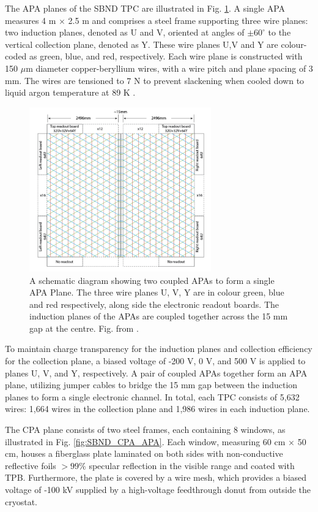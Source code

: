 The APA planes of the SBND TPC are illustrated in Fig. \ref{fig:SBND_APA}. 
A single APA measures 4 m $\times$ 2.5 m and comprises a steel frame supporting three wire planes: two induction planes, denoted as U and V, oriented at angles of $\pm 60^{\circ}$ to the vertical collection plane, denoted as Y. 
These wire planes U,V and Y are colour-coded as green, blue, and red, respectively.
Each wire plane is constructed with 150 $\mu$m diameter copper-beryllium wires, with a wire pitch and plane spacing of 3 mm. 
The wires are tensioned to 7 N to prevent slackening when cooled down to liquid argon temperature at 89 K \cite{SBND_Wires}.
\begin{figure}[hbp] 
\centering    
\includegraphics[width=0.70\textwidth]{SBND_APA}
\caption[SBND_APA]{
A schematic diagram showing two coupled APAs to form a single APA Plane.
The three wire planes U, V, Y are in colour green, blue and red respectively, along side the electronic readout boards.
The induction planes of the APAs are coupled together across the 15 mm gap at the centre.
Fig. from \cite{SBNProposal}.
}
\label{fig:SBND_APA}
\end{figure}
To maintain charge transparency for the induction planes and collection efficiency for the collection plane, a biased voltage of -200 V, 0 V, and 500 V is applied to planes U, V, and Y, respectively.
A pair of coupled APAs together form an APA plane, utilizing jumper cables to bridge the 15 mm gap between the induction planes to form a single electronic channel. 
In total, each TPC consists of 5,632 wires: 1,664 wires in the collection plane and 1,986 wires in each induction plane.

The CPA plane consists of two steel frames, each containing 8 windows, as illustrated in Fig. \ref{fig:SBND_CPA_APA}. 
Each window, measuring 60 cm $\times$ 50 cm, houses a fiberglass plate laminated on both sides with non-conductive reflective foils $> 99\%$ specular reflection in the visible range and coated with TPB.
Furthermore, the plate is covered by a wire mesh, which provides a biased voltage of -100 kV supplied by a high-voltage feedthrough donut from outside the cryostat.

